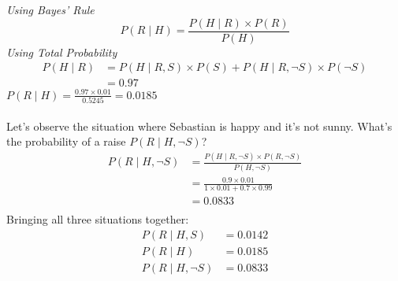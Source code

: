 \documentclass[12pt]{article}
\begin{document}
\textit{Using Bayes' Rule}
\begin{equation}
P(R \mid H) = \frac{P(H \mid R) \times P(R)}{P(H)}
\end{equation}
\textit{Using Total Probability}
\begin{align*}
P(H \mid R) &=  P(H \mid R,S) \times P(S) + P(H \mid R, \neg S) \times P(\neg S)\\
&= 0.97
\end{align*}
\(P(R \mid H) = \frac{0.97 \times 0.01}{0.5245} = 0.0185\)\\\\
Let's observe the situation where Sebastian is happy and it's not sunny. What's the probability of a raise \(P(R \mid H, \neg S)\)?\\
\begin{align*}
P(R \mid H, \neg S) &= \frac{P(H \mid R, \neg S) \times P(R, \neg S)}{P(H, \neg S)}\\
&= \frac{0.9 \times 0.01}{1 \times 0.01 + 0.7 \times 0.99}\\
&= 0.0833\\
\end{align*}
Bringing all three situations together:\\
\begin{align*}
P(R \mid H, S) &= 0.0142\\
P(R \mid H) &= 0.0185\\
P(R \mid H, \neg S) &= 0.0833\\
\end{align*}
\end{document}
